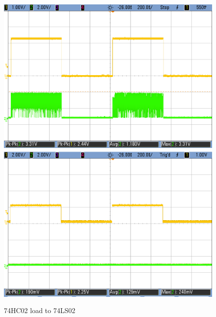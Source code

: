\begin{figure}[h!]
	   \includegraphics[scale=0.19]{HC-LS-2p3V.png}\hspace{1cm}
        \includegraphics[scale=0.19]{HC-LS-2V.png}\hspace{1cm}
        \caption{\color{cyan}74HC02 load to 74LS02}
        \label{fig:ej2exhctols}
    \end{figure}
    
